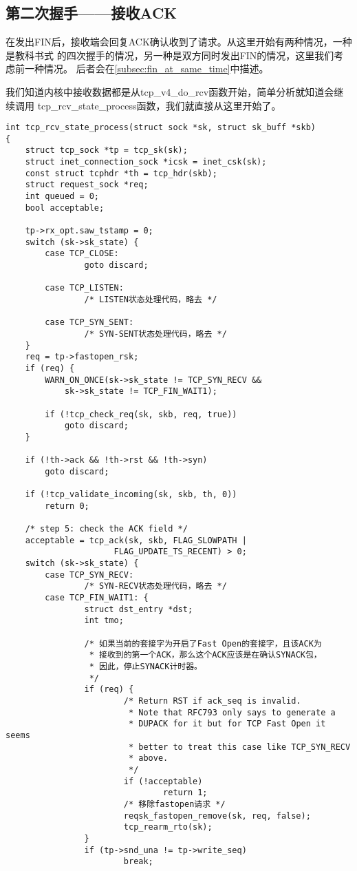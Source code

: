 	\subsection{第二次握手——接收ACK}
		在发出FIN后，接收端会回复ACK确认收到了请求。从这里开始有两种情况，一种是教科书式
		的四次握手的情况，另一种是双方同时发出FIN的情况，这里我们考虑前一种情况。
		后者会在\ref{subsec:fin_at_same_time}中描述。
		
		我们知道内核中接收数据都是从tcp\_v4\_do\_rcv函数开始，简单分析就知道会继续调用
		tcp\_rcv\_state\_process函数，我们就直接从这里开始了。

\begin{verbatim}
int tcp_rcv_state_process(struct sock *sk, struct sk_buff *skb)
{
	struct tcp_sock *tp = tcp_sk(sk);
	struct inet_connection_sock *icsk = inet_csk(sk);
	const struct tcphdr *th = tcp_hdr(skb);
	struct request_sock *req;
	int queued = 0;
	bool acceptable;

	tp->rx_opt.saw_tstamp = 0;
	switch (sk->sk_state) {
		case TCP_CLOSE:
		        goto discard;

		case TCP_LISTEN:
		        /* LISTEN状态处理代码，略去 */

		case TCP_SYN_SENT:
		        /* SYN-SENT状态处理代码，略去 */
	}
	req = tp->fastopen_rsk;
	if (req) {
		WARN_ON_ONCE(sk->sk_state != TCP_SYN_RECV &&
		    sk->sk_state != TCP_FIN_WAIT1);

		if (!tcp_check_req(sk, skb, req, true))
			goto discard;
	}

	if (!th->ack && !th->rst && !th->syn)
		goto discard;

	if (!tcp_validate_incoming(sk, skb, th, 0))
		return 0;

	/* step 5: check the ACK field */
	acceptable = tcp_ack(sk, skb, FLAG_SLOWPATH |
				      FLAG_UPDATE_TS_RECENT) > 0;
	switch (sk->sk_state) {
		case TCP_SYN_RECV:
		        /* SYN-RECV状态处理代码，略去 */
		case TCP_FIN_WAIT1: {
		        struct dst_entry *dst;
		        int tmo;

		        /* 如果当前的套接字为开启了Fast Open的套接字，且该ACK为
		         * 接收到的第一个ACK，那么这个ACK应该是在确认SYNACK包，
		         * 因此，停止SYNACK计时器。
		         */
		        if (req) {
		                /* Return RST if ack_seq is invalid.
		                 * Note that RFC793 only says to generate a
		                 * DUPACK for it but for TCP Fast Open it seems
		                 * better to treat this case like TCP_SYN_RECV
		                 * above.
		                 */
		                if (!acceptable)
		                        return 1;
		                /* 移除fastopen请求 */
		                reqsk_fastopen_remove(sk, req, false);
		                tcp_rearm_rto(sk);
		        }
		        if (tp->snd_una != tp->write_seq)
		                break;


\end{verbatim}

